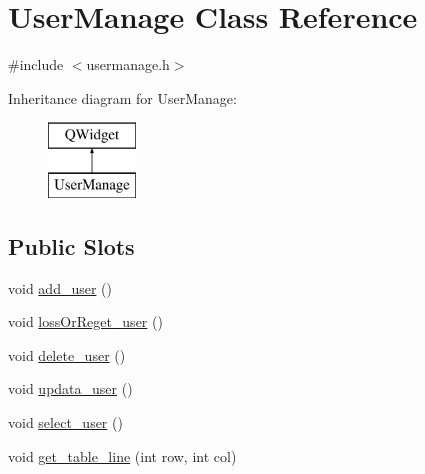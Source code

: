 \hypertarget{class_user_manage}{}\section{User\+Manage Class Reference}
\label{class_user_manage}


{\ttfamily \#include $<$usermanage.\+h$>$}

Inheritance diagram for User\+Manage\+:\begin{figure}[H]
\begin{center}
\leavevmode
\includegraphics[height=2.000000cm]{class_user_manage}
\end{center}
\end{figure}
\subsection*{Public Slots}
\begin{DoxyCompactItemize}
\item 
void \mbox{\hyperlink{class_user_manage_a7058bbb981e4c6b3064c3e5e334ac700}{add\+\_\+user}} ()
\item 
void \mbox{\hyperlink{class_user_manage_a82a9b76e62d1d7383e264019066082b8}{loss\+Or\+Reget\+\_\+user}} ()
\item 
void \mbox{\hyperlink{class_user_manage_a254765c27c79b94370dd9f1e44551355}{delete\+\_\+user}} ()
\item 
void \mbox{\hyperlink{class_user_manage_ab7f81e5e1f3d9944c551401dba37693f}{updata\+\_\+user}} ()
\item 
void \mbox{\hyperlink{class_user_manage_aa6252c8286f24959ec4b938054328bf7}{select\+\_\+user}} ()
\item 
void \mbox{\hyperlink{class_user_manage_acf5b626b21868282ff4ad9dcccf8c765}{get\+\_\+table\+\_\+line}} (int row, int col)
\end{DoxyCompactItemize}
